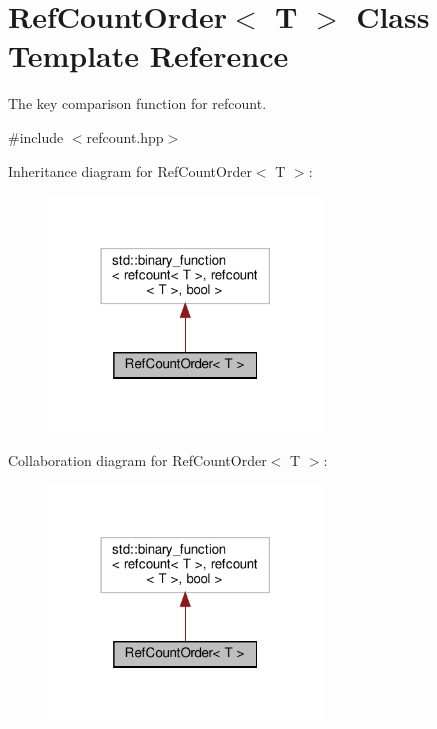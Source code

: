 \hypertarget{classRefCountOrder}{}\section{Ref\+Count\+Order$<$ T $>$ Class Template Reference}
\label{classRefCountOrder}


The key comparison function for refcount.  




{\ttfamily \#include $<$refcount.\+hpp$>$}



Inheritance diagram for Ref\+Count\+Order$<$ T $>$\+:
\nopagebreak
\begin{figure}[H]
\begin{center}
\leavevmode
\includegraphics[width=206pt]{d4/de1/classRefCountOrder__inherit__graph}
\end{center}
\end{figure}


Collaboration diagram for Ref\+Count\+Order$<$ T $>$\+:
\nopagebreak
\begin{figure}[H]
\begin{center}
\leavevmode
\includegraphics[width=206pt]{dc/d9a/classRefCountOrder__coll__graph}
\end{center}
\end{figure}
